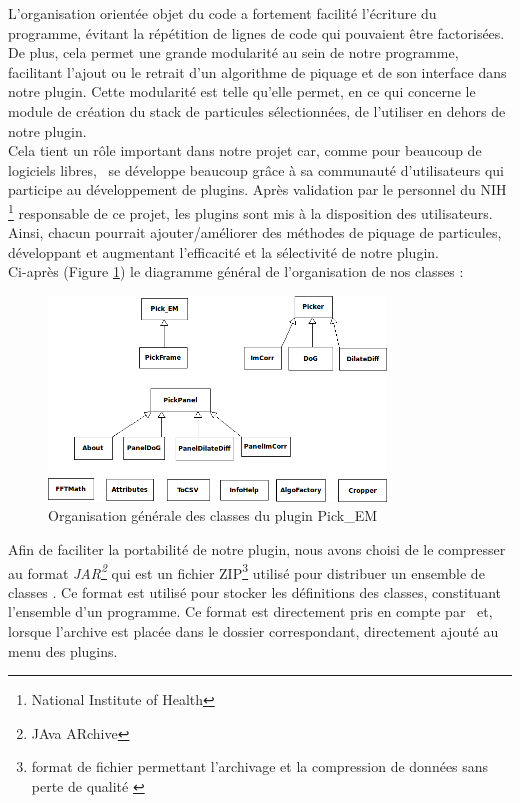 L'organisation orientée objet du code a fortement facilité l'écriture du programme, évitant la répétition de lignes de code qui pouvaient \^etre factorisées. De plus, cela permet une grande modularité au sein de notre programme, facilitant l'ajout ou le retrait d'un algorithme de piquage et de son interface dans notre plugin. Cette modularité est telle qu'elle permet, en ce qui concerne le module de création du stack de particules sélectionnées, de l'utiliser en dehors de notre plugin.\\
Cela tient un rôle important dans notre projet car, comme pour beaucoup de logiciels libres, \imj ~se développe beaucoup gr\^ace à sa communauté d'utilisateurs qui participe au développement de plugins. Après validation par le personnel du NIH \footnote{National Institute of Health} responsable de ce projet, les plugins sont mis à la disposition des utilisateurs. Ainsi, chacun pourrait ajouter/améliorer des méthodes de piquage de particules, développant et augmentant l'efficacité et la sélectivité de notre plugin. \\

Ci-après (Figure \ref{classes}) le diagramme général de l'organisation de nos classes :

\begin{figure}[!h] 
\begin{center}
\includegraphics[width=0.8\textwidth]{class_diagram.png}
\caption{Organisation générale des classes du plugin Pick\_EM}
\label{classes}
\end{center}
\end{figure}

Afin de faciliter la portabilité de notre plugin, nous avons choisi de le compresser au format \emph{JAR\footnote{JAva ARchive\cite{jar:url}}} qui est un fichier ZIP\footnote{format de fichier permettant l'archivage et la compression de données sans perte de qualité \cite{zip:url}} utilisé pour distribuer un ensemble de classes \java. Ce format est utilisé pour stocker les définitions des classes, constituant l'ensemble d'un programme.
Ce format est directement pris en compte par \imj ~et, lorsque l'archive est placée dans le dossier correspondant, directement ajouté au menu des plugins.\\

